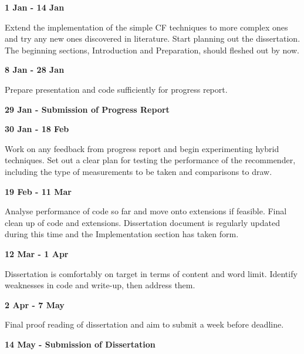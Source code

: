 \textbf{1 Jan - 14 Jan}

Extend the implementation of the simple CF techniques to more complex ones and try any new ones discovered in literature.
Start planning out the dissertation. The beginning sections, Introduction and Preparation, should fleshed out by now.

\textbf{8 Jan - 28 Jan}

Prepare presentation and code sufficiently for progress report.

\textbf{29 Jan - Submission of Progress Report}

\textbf{30 Jan - 18 Feb}

Work on any feedback from progress report and begin experimenting hybrid techniques.
Set out a clear plan for testing the performance of the recommender, including the type of measurements to be taken and comparisons to draw.

\textbf{19 Feb - 11 Mar}

Analyse performance of code so far and move onto extensions if feasible.
Final clean up of code and extensions.
Dissertation document is regularly updated during this time and the Implementation section has taken form.

\textbf{12 Mar - 1 Apr}

Dissertation is comfortably on target in terms of content and word limit.
Identify weaknesses in code and write-up, then address them.

\textbf{2 Apr - 7 May}

Final proof reading of dissertation and aim to submit a week before deadline.

\textbf{14 May - Submission of Dissertation}
